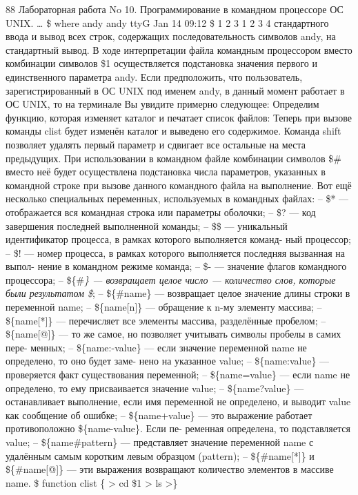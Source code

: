 \documentclass[
  letterpaper,
  DIV=11,
  numbers=noendperiod]{scrartcl}
\begin{document}
88 Лабораторная работа No 10. Программирование в командном процессоре ОС
UNIX. \ldots{} \$ where andy andy ttyG Jan 14 09:12 \$ 1 2 3 1 2 3 4
стандартного ввода и вывод всех строк, содержащих последовательность
символов andy, на стандартный вывод. В ходе интерпретации файла
командным процессором вместо комбинации символов \$1 осуществляется
подстановка значения первого и единственного параметра andy. Если
предположить, что пользователь, зарегистрированный в ОС UNIX под именем
andy, в данный момент работает в ОС UNIX, то на терминале Вы увидите
примерно следующее: Определим функцию, которая изменяет каталог и
печатает список файлов: Теперь при вызове команды clist будет изменён
каталог и выведено его содержимое. Команда shift позволяет удалять
первый параметр и сдвигает все остальные на места предыдущих. При
использовании в командном файле комбинации символов \$\# вместо неё
будет осуществлена подстановка числа параметров, указанных в командной
строке при вызове данного командного файла на выполнение. Вот ещё
несколько специальных переменных, используемых в командных файлах: --
\$* --- отображается вся командная строка или параметры оболочки; -- \$?
--- код завершения последней выполненной команды; -- \$\$ --- уникальный
идентификатор процесса, в рамках которого выполняется команд- ный
процессор; -- \$! --- номер процесса, в рамках которого выполняется
последняя вызванная на выпол- нение в командном режиме команда; -- \$-
--- значение флагов командного процессора; -- \$\{\#\emph{\} ---
возвращает целое число --- количество слов, которые были результатом
\$}; -- \$\{\#name\} --- возвращает целое значение длины строки в
переменной name; -- \$\{name{[}n{]}\} --- обращение к n-му элементу
массива; -- \$\{name{[}*{]}\} --- перечисляет все элементы массива,
разделённые пробелом; -- \$\{name{[}@{]}\} --- то же самое, но позволяет
учитывать символы пробелы в самих пере- менных; -- \$\{name:-value\} ---
если значение переменной name не определено, то оно будет заме- нено на
указанное value; -- \$\{name:value\} --- проверяется факт существования
переменной; -- \$\{name=value\} --- если name не определено, то ему
присваивается значение value; -- \$\{name?value\} --- останавливает
выполнение, если имя переменной не определено, и выводит value как
сообщение об ошибке; -- \$\{name+value\} --- это выражение работает
противоположно \$\{name-value\}. Если пе- ременная определена, то
подставляется value; -- \$\{name\#pattern\} --- представляет значение
переменной name с удалённым самым коротким левым образцом (pattern); --
\$\{\#name{[}*{]}\} и \$\{\#name{[}@{]}\} --- эти выражения возвращают
количество элементов в массиве name. \$ function clist \{ \textgreater{}
cd \$1 \textgreater{} ls \textgreater\}
\end{document}
